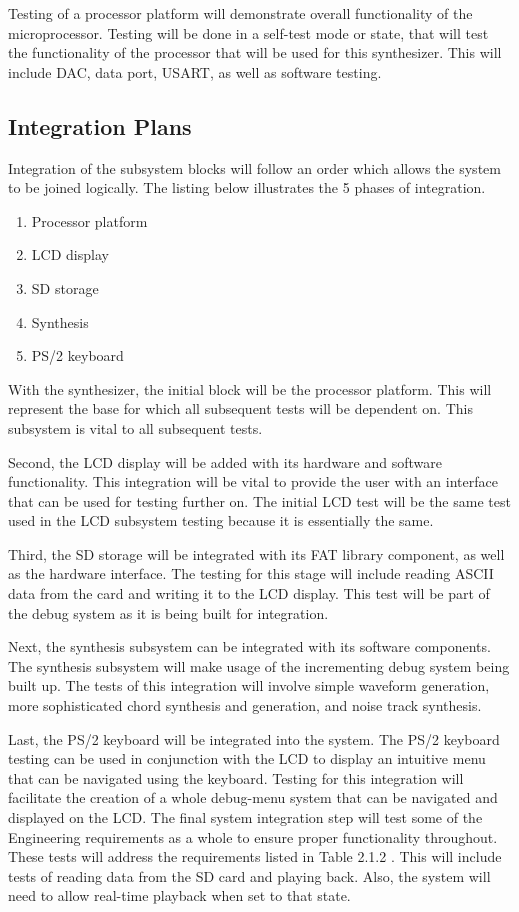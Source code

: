 \documentclass[bibtotocnumbered,abstract=on,paper=a4,fontsize=12pt,parskip=on,halfparskip=on]{scrartcl}		%
\begin{document}
Testing of a processor platform will demonstrate overall functionality of the microprocessor. Testing will be done in a self-test mode or state, that will test the functionality of the processor that will be used for this synthesizer. This will include DAC, data port, USART, as well as software testing.

  \subsection{Integration Plans}

Integration of the subsystem blocks will follow an order which allows the system to be joined logically. The listing below illustrates the 5 phases of integration.

  \begin{enumerate}
    \item{Processor platform}
    \item{LCD display}
    \item{SD storage}
    \item{Synthesis}
    \item{PS/2 keyboard}
  \end{enumerate}

With the synthesizer, the initial block will be the processor platform. This will represent the base for which all subsequent tests will be dependent on. This subsystem is vital to all subsequent tests. 

Second, the LCD display will be added with its hardware and software functionality. This integration will be vital to provide the user with an interface that can be used for testing further on. The initial LCD test will be the same test used in the LCD subsystem testing because it is essentially the same.

Third, the SD storage will be integrated with its FAT library component, as well as the hardware interface. The testing for this stage will include reading ASCII data from the card and writing it to the LCD display. This test will be part of the debug system as it is being built for integration.

Next, the synthesis subsystem can be integrated with its software components. The synthesis subsystem will make usage of the incrementing debug system being built up. The tests of this integration will involve simple waveform generation, more sophisticated chord synthesis and generation, and noise track synthesis.

Last, the PS/2 keyboard will be integrated into the system. The PS/2 keyboard testing can be used in conjunction with the LCD to display an intuitive menu that can be navigated using the keyboard. Testing for this integration will facilitate the creation of a whole debug-menu system that can be navigated and displayed on the LCD.
The final system integration step will test some of the Engineering requirements as a whole to ensure proper functionality throughout. These tests will address the requirements listed in Table 2.1.2 . This will include tests of reading data from the SD card and playing back. Also, the system will need to allow real-time playback when set to that state.
\end{document}
